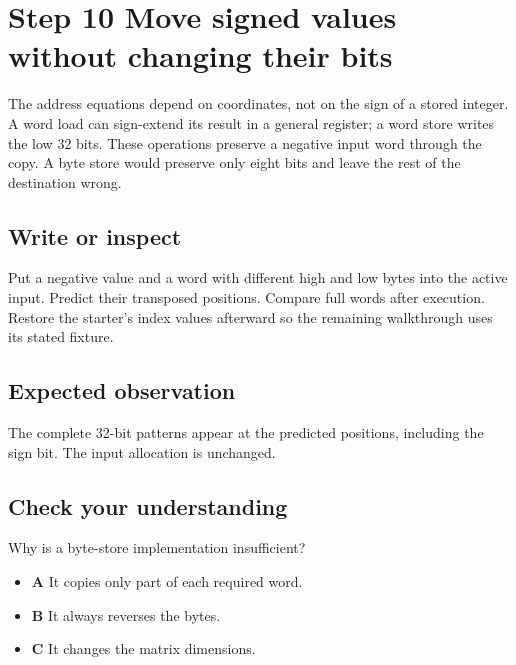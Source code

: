\section{Step 10 Move signed values without changing their bits}\label{transpose-s10}

The address equations depend on coordinates, not on the sign of a stored integer. A word load can sign-extend its result in a general register; a word store writes the low 32 bits. These operations preserve a negative input word through the copy. A byte store would preserve only eight bits and leave the rest of the destination wrong.

\subsection{Write or inspect}
Put a negative value and a word with different high and low bytes into the active input. Predict their transposed positions. Compare full words after execution. Restore the starter's index values afterward so the remaining walkthrough uses its stated fixture.

\subsection{Expected observation}
The complete 32-bit patterns appear at the predicted positions, including the sign bit. The input allocation is unchanged.

\subsection{Check your understanding}
Why is a byte-store implementation insufficient?

\begin{itemize}
  \item \textbf{A} It copies only part of each required word.
  \item \textbf{B} It always reverses the bytes.
  \item \textbf{C} It changes the matrix dimensions.
\end{itemize}
